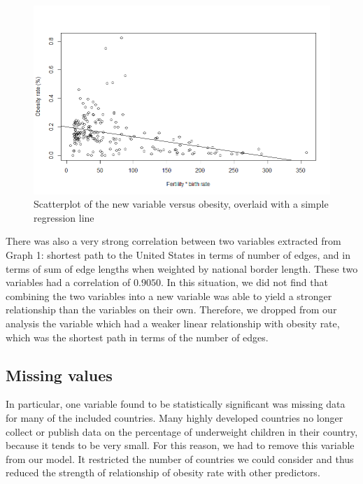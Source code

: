 \documentclass[oneside,12pt]{report}
\begin{document}
\begin{figure}
\centering
\label{fig:fertility.birth_rate}
\includegraphics[width=\textwidth]{fertility-birth_rate-obesity-scatter.png}
\caption[Scatterplot of a new variable created from combining two variables]{Scatterplot of the new variable versus obesity, overlaid with a simple regression line}
\end{figure}

There was also a very strong correlation between two variables extracted from Graph 1: shortest path to the United States in terms of number of edges, and in terms of sum of edge lengths when weighted by national border length. These two variables had a correlation of \begin{math}0.9050\end{math}. In this situation, we did not find that combining the two variables into a new variable was able to yield a stronger relationship than the variables on their own. Therefore, we dropped from our analysis the variable which had a weaker linear relationship with obesity rate, which was the shortest path in terms of the number of edges.

\subsection*{Missing values}

In particular, one variable found to be statistically significant was missing data for many of the included countries. Many highly developed countries no longer collect or publish data on the percentage of underweight children in their country, because it tends to be very small. For this reason, we had to remove this variable from our model. It restricted the number of countries we could consider and thus reduced the strength of relationship of obesity rate with other predictors.
\end{document}
